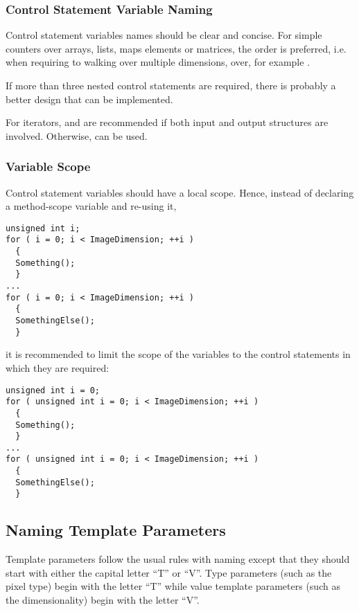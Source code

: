 \subsubsection{Control Statement Variable Naming}
\label{subsubsec:ControlStatementVariableNaming}

Control statement variables names should be clear and concise. For simple
counters over arrays, lists, maps elements or matrices, the 
order is preferred, i.e. when requiring to walking over multiple dimensions,
over, for example .

If more than three nested control statements are required, there is probably
a better design that can be implemented.

For iterators,  and  are recommended if both input and
output structures are involved. Otherwise,  can be used.


\subsubsection{Variable Scope}
\label{subsubsec:VariableScope}

Control statement variables should have a local scope. Hence, instead of
declaring a method-scope variable and re-using it,
\small
\begin{verbatim}
unsigned int i;
for ( i = 0; i < ImageDimension; ++i )
  {
  Something();
  }
...
for ( i = 0; i < ImageDimension; ++i )
  {
  SomethingElse();
  }
\end{verbatim}
\normalsize

it is recommended to limit the scope of the variables to the control
statements in which they are required:

\small
\begin{verbatim}
unsigned int i = 0;
for ( unsigned int i = 0; i < ImageDimension; ++i )
  {
  Something();
  }
...
for ( unsigned int i = 0; i < ImageDimension; ++i )
  {
  SomethingElse();
  }
\end{verbatim}
\normalsize


\subsection{Naming Template Parameters}
\label{subsec:NamingTemplateParameters}

Template parameters follow the usual rules with naming except that they should
start with either the capital letter ``T'' or ``V''. Type parameters (such as
the pixel type) begin with the letter ``T'' while value template parameters
(such as the dimensionality) begin with the letter ``V''.

